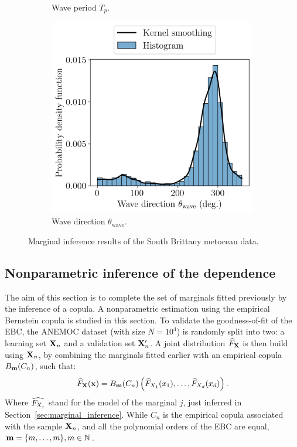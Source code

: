 \begin{figure}
\begin{subfigure}[b]{0.32\textwidth}
        \caption{Wave period $T_p$.}
    \end{subfigure}
    \begin{subfigure}[b]{0.32\textwidth}
        \centering
        \includegraphics[width=\linewidth]{../numerical_experiments/chapter3/figures/wave_dir_distribution_SB.png}
        \caption{Wave direction $\theta_{\mathrm{wave}}$.}
    \end{subfigure}
    \caption{Marginal inference results of the South Brittany metocean data.}
    \label{fig:marginals_sb}
\end{figure}

\newpage
\subsection{Nonparametric inference of the dependence}

The aim of this section is to complete the set of marginals fitted previously by the inference of a copula. 
A nonparametric estimation using the empirical Bernstein copula is studied in this section. 
To validate the goodness-of-fit of the EBC, the ANEMOC dataset (with size $N=10^4$) is randomly split into two:
a learning set ${\bf X}_n$ and a validation set ${\bf X}_n'$. 
A joint distribution $\widehat{F}_{\bf X}$ is then build using ${\bf X}_n$, by combining the marginals fitted earlier with an empirical copula $B_{{\bf m}}(C_n)$, such that: 
\begin{equation}
    \widehat{F}_{\bf X}({\bf x}) = B_{{\bf m}}(C_n)\left(\widehat{F}_{X_1}(x_1), \dots, \widehat{F}_{X_d}(x_d)\right).
\end{equation}
Where $\widehat{F_{X_j}}$ stand for the model of the marginal $j$, just inferred in Section~\ref{sec:marginal_inference}. 
While $C_n$ is the empirical copula associated with the sample ${\bf X}_n$, and all the polynomial orders of the EBC are equal, ${\bf m} = \{m, \dots, m\}, m\in\mathbb{N}$.

